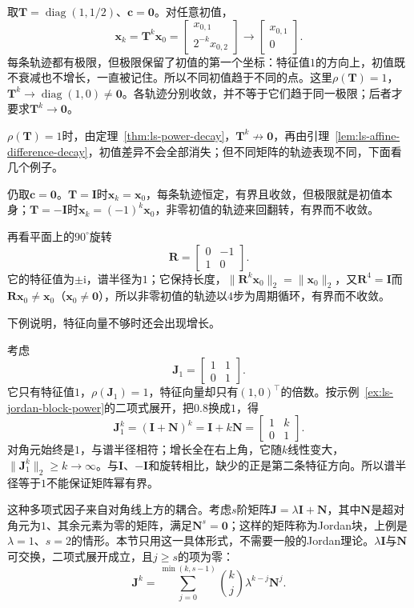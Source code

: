 \begin{example}[反例：各轨迹收敛但极限不同]
\label{ex:ls-separate-limits}
取$\bm T=\operatorname{diag}(1,1/2)$、$\bm c=\bm0$。对任意初值，
\[
 \bm x_k=\bm T^k\bm x_0=\begin{bmatrix}x_{0,1}\\2^{-k}x_{0,2}\end{bmatrix}\to\begin{bmatrix}x_{0,1}\\0\end{bmatrix}.
\]
每条轨迹都有极限，但极限保留了初值的第一个坐标：特征值$1$的方向上，初值既不衰减也不增长，一直被记住。所以不同初值趋于不同的点。这里$\rho(\bm T)=1$，$\bm T^k\to\operatorname{diag}(1,0)\neq\bm0$。各轨迹分别收敛，并不等于它们趋于同一极限；后者才要求$\bm T^k\to\bm0$。
\end{example}

$\rho(\bm T)=1$时，由定理~\ref{thm:ls-power-decay}，$\bm T^k\not\to\bm0$，再由引理~\ref{lem:ls-affine-difference-decay}，初值差异不会全部消失；但不同矩阵的轨迹表现不同，下面看几个例子。

仍取$\bm c=\bm0$。$\bm T=\bm I$时$\bm x_k=\bm x_0$，每条轨迹恒定，有界且收敛，但极限就是初值本身；$\bm T=-\bm I$时$\bm x_k=(-1)^k\bm x_0$，非零初值的轨迹来回翻转，有界而不收敛。

再看平面上的$90^\circ$旋转
\[
 \bm R=\begin{bmatrix}0&-1\\1&0\end{bmatrix}.
\]
它的特征值为$\pm\mathrm i$，谱半径为$1$；它保持长度，$\lVert\bm R^k\bm x_0\rVert_2=\lVert\bm x_0\rVert_2$，又$\bm R^4=\bm I$而$\bm R\bm x_0\neq\bm x_0$（$\bm x_0\neq\bm0$），所以非零初值的轨迹以$4$步为周期循环，有界而不收敛。

下例说明，特征向量不够时还会出现增长。
\begin{example}
\label{ex:ls-unit-spectral-radius-growth}
考虑
\[
 \bm J_1=\begin{bmatrix}1&1\\0&1\end{bmatrix}.
\]
它只有特征值$1$，$\rho(\bm J_1)=1$，特征向量却只有$(1,0)^\top$的倍数。按示例~\ref{ex:ls-jordan-block-power}的二项式展开，把$0.8$换成$1$，得
\[
 \bm J_1^k=(\bm I+\bm N)^k=\bm I+k\bm N=\begin{bmatrix}1&k\\0&1\end{bmatrix}.
\]
对角元始终是$1$，与谱半径相符；增长全在右上角，它随$k$线性变大，$\lVert\bm J_1^k\rVert_2\geq k\to\infty$。与$\bm I$、$-\bm I$和旋转相比，缺少的正是第二条特征方向。所以谱半径等于$1$不能保证矩阵幂有界。
\end{example}
这种多项式因子来自对角线上方的耦合。考虑$s$阶矩阵$\bm J=\lambda\bm I+\bm N$，其中$\bm N$是超对角元为$1$、其余元素为零的矩阵，满足$\bm N^s=\bm0$；这样的矩阵称为Jordan块，上例是$\lambda=1$、$s=2$的情形。本节只用这一具体形式，不需要一般的Jordan理论。$\lambda\bm I$与$\bm N$可交换，二项式展开成立，且$j\geq s$的项为零：
\begin{equation}
 \bm J^k=\sum_{j=0}^{\min(k,s-1)}\binom{k}{j}\lambda^{k-j}\bm N^j .
 \label{eq:ch06-jordan-power}
\end{equation}

